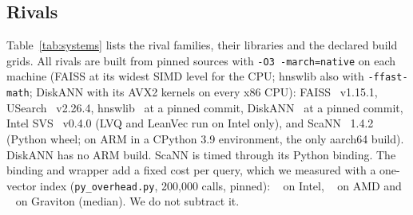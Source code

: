\subsection{Rivals}

Table~\ref{tab:systems} lists the rival families, their libraries and the declared build grids.
All rivals are built from pinned sources with \texttt{-O3 -march=native} on each machine (FAISS at its
widest SIMD level for the CPU; hnswlib also with \texttt{-ffast-math}; DiskANN with its AVX2 kernels on
every x86 CPU): FAISS~\cite{douze2024faiss}
v1.15.1, USearch~\cite{vardanian2023usearch} v2.26.4, hnswlib~\cite{nmslib2017hnswlib} at a pinned commit,
DiskANN~\cite{subramanya2019diskann} at a pinned commit, Intel SVS~\cite{aguerrebere2023lvq,tepper2024leanvec}
v0.4.0 (LVQ and LeanVec run on Intel only), and ScaNN~\cite{guo2020scann,sun2023soar} 1.4.2 (Python
wheel; on ARM in a CPython 3.9 environment, the only aarch64 build). DiskANN has no ARM build. ScaNN
is timed through its Python binding. The binding and wrapper add a fixed cost per query, which we
measured with a one-vector index (\texttt{py\_overhead.py}, 200,000 calls, pinned): ~\us{}
on Intel, ~\us{} on AMD and ~\us{} on Graviton (median). We do not
subtract it.


